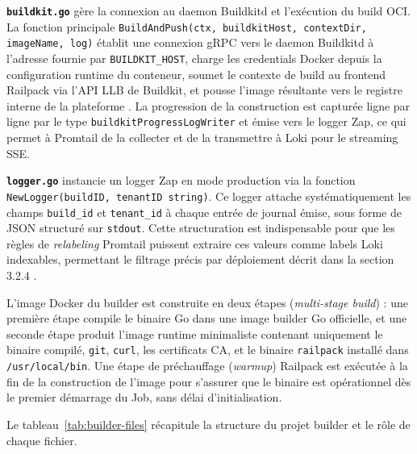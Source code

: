 \textbf{\texttt{buildkit.go}} gère la connexion au daemon Buildkitd et l'exécution du build OCI. La fonction principale \texttt{BuildAndPush(ctx, buildkitHost, contextDir, imageName, log)} établit une connexion gRPC vers le daemon Buildkitd à l'adresse fournie par \texttt{BUILDKIT\_HOST}, charge les credentials Docker depuis la configuration runtime du conteneur, soumet le contexte de build au frontend Railpack via l'API LLB de Buildkit, et pousse l'image résultante vers le registre interne de la plateforme \cite{buildkit-client}. La progression de la construction est capturée ligne par ligne par le type \texttt{buildkitProgressLogWriter} et émise vers le logger Zap, ce qui permet à Promtail de la collecter et de la transmettre à Loki pour le streaming SSE.

\textbf{\texttt{logger.go}} instancie un logger Zap en mode production via la fonction \texttt{NewLogger(buildID, tenantID string)}. Ce logger attache systématiquement les champs \texttt{build\_id} et \texttt{tenant\_id} à chaque entrée de journal émise, sous forme de JSON structuré sur \texttt{stdout}. Cette structuration est indispensable pour que les règles de \textit{relabeling} Promtail puissent extraire ces valeurs comme labels Loki indexables, permettant le filtrage précis par déploiement décrit dans la section 3.2.4 \cite{zap-logger}.

L'image Docker du builder est construite en deux étapes (\textit{multi-stage build}) : une première étape compile le binaire Go dans une image builder Go officielle, et une seconde étape produit l'image runtime minimaliste contenant uniquement le binaire compilé, \texttt{git}, \texttt{curl}, les certificats CA, et le binaire \texttt{railpack} installé dans \texttt{/usr/local/bin}. Une étape de préchauffage (\textit{warmup}) Railpack est exécutée à la fin de la construction de l'image pour s'assurer que le binaire est opérationnel dès le premier démarrage du Job, sans délai d'initialisation.

Le tableau~\ref{tab:builder-files} récapitule la structure du projet builder et le rôle de chaque fichier.

